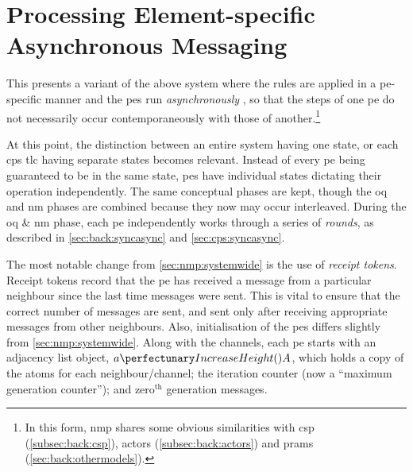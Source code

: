 \section{\label{sec:nmp:pespecific}Processing Element-specific Asynchronous Messaging}

This  presents a variant of the above system where the rules are applied in a \gls{pe}-specific manner and the \glspl{pe} run \emph{asynchronously} \cite{Balanescu2011,Nicolescu2014}, so that the steps of one \gls{pe} do not necessarily occur contemporaneously with those of another.\footnote{In this form, \gls{nmp} shares some obvious similarities with \Gls{csp} (\cref{subsec:back:csp}), \Glspl{actor} (\cref{subsec:back:actors}) and \Glspl{pram} (\cref{sec:back:othermodels}).}  

At this point, the distinction between an entire system having one state, or each \gls{cps} \gls{tlc} having separate states becomes relevant.  Instead of every \gls{pe} being guaranteed to be in the same state, \glspl{pe} have individual states dictating their operation independently.  The same conceptual phases are kept, though the \gls{oq} and \gls{nm} phases are combined because they now may occur interleaved.  During the \gls{oq} \& \gls{nm} phase, each \gls{pe} independently works through a series of \label{pg:nmp:rounds}\emph{rounds}, as described in \vref{sec:back:syncasync} and \vref{sec:cps:syncasync}. %

The most notable change from \cref{sec:nmp:systemwide} is the use of \emph{receipt tokens}.  Receipt tokens record that the \gls{pe} has received a message from a particular neighbour since the last time messages were sent.  This is vital to ensure that the correct number of messages are sent, and sent only after receiving appropriate messages from other neighbours.  Also, initialisation of the \glspl{pe} differs slightly from \cref{sec:nmp:systemwide}.  Along with the channels, each \gls{pe} starts with an adjacency list object, \(\cpfunc{a}{A}\), which holds a copy of the atoms for each neighbour/channel; the iteration counter (now a ``maximum generation counter''); and \(\text{zero}^{\text{th}}\) generation messages.

